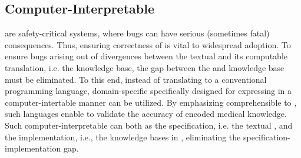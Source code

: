 \subsection{Computer-Interpretable \BPGs{}}

\CDSSs{} are safety-critical systems, where bugs can have serious (sometimes fatal)
consequences. Thus, ensuring correctness of \CDSSs{} is vital to widespread
adoption. To ensure bugs arising out of divergences between the textual \BPG{}
and its computable translation, i.e. the knowledge base, the gap between
the \BPG{} and knowledge base must be eliminated. To this end, instead of
translating \BPGs{} to a conventional programming language, domain-specific
specifically designed for expressing \BPGs{} in a computer-intertable manner can
be utilized. By emphasizing comprehensible to \HCPs{}, such languages enable
\HCPs{} to validate the accuracy of encoded medical knowledge.
Such computer-interpretable \BPGs{} can both as the specification, i.e. the textual \BPGs{},
and the implementation, i.e., the knowledge bases in \CDSSs{}, eliminating the
specification-implementation gap.















